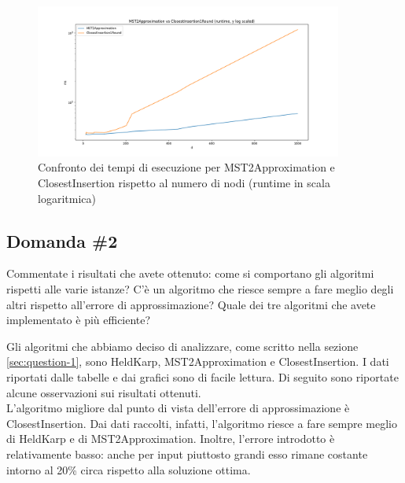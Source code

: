 \begin{figure}[H]
    \centering

    \includegraphics[width=0.9\textwidth]{./images/MST2Approximation_vs_ClosestInsertion1Round__runtime__y_log_scaled_.png}

    \caption{Confronto dei tempi di esecuzione per MST2Approximation e ClosestInsertion rispetto al numero di nodi (runtime in scala logaritmica)}
    \label{fig:mst2approx-closestinsertion-runtime}
\end{figure}

\subsection{Domanda \#2}
\label{sec:question-2}

\begin{displayquote}
Commentate i risultati che avete ottenuto: come si comportano gli
algoritmi rispetti alle varie istanze? C'è un algoritmo che riesce
sempre a fare meglio degli altri rispetto all'errore di
approssimazione? Quale dei tre algoritmi che avete implementato è
più efficiente?
\end{displayquote}

\noindent Gli algoritmi che abbiamo deciso di analizzare, come scritto
nella sezione \ref{sec:question-1}, sono HeldKarp, MST2Approximation e
ClosestInsertion. I dati riportati dalle tabelle e dai grafici sono di
facile lettura. Di seguito sono riportate alcune osservazioni sui
risultati ottenuti. \\

\noindent L'algoritmo migliore dal punto di vista dell'errore di
approssimazione è ClosestInsertion. Dai dati raccolti, infatti,
l'algoritmo riesce a fare sempre meglio di HeldKarp e di
MST2Approximation. Inoltre, l'errore introdotto è relativamente basso:
anche per input piuttosto grandi esso rimane costante intorno al 20\%
circa rispetto alla soluzione ottima. \\

